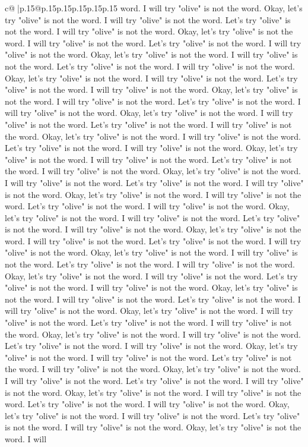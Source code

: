 \documentclass{article}
\begin{document}
{\begin{supertabular}{c@{$\;$}|p{.15\linewidth}@{}p{.15\linewidth}p{.15\linewidth}p{.15\linewidth}p{.15\linewidth}p{.15\linewidth}}
{{{word. I will try "olive" is not the word. Okay, let's try "olive" is not the word. I will try "olive" is not the word. Let's try "olive" is not the word. I will try "olive" is not the word. Okay, let's try "olive" is not the word. I will try "olive" is not the word. Let's try "olive" is not the word. I will try "olive" is not the word. Okay, let's try "olive" is not the word. I will try "olive" is not the word. Let's try "olive" is not the word. I will try "olive" is not the word. Okay, let's try "olive" is not the word. I will try "olive" is not the word. Let's try "olive" is not the word. I will try "olive" is not the word. Okay, let's try "olive" is not the word. I will try "olive" is not the word. Let's try "olive" is not the word. I will try "olive" is not the word. Okay, let's try "olive" is not the word. I will try "olive" is not the word. Let's try "olive" is not the word. I will try "olive" is not the word. Okay, let's try "olive" is not the word. I will try "olive" is not the word. Let's try "olive" is not the word. I will try "olive" is not the word. Okay, let's try "olive" is not the word. I will try "olive" is not the word. Let's try "olive" is not the word. I will try "olive" is not the word. Okay, let's try "olive" is not the word. I will try "olive" is not the word. Let's try "olive" is not the word. I will try "olive" is not the word. Okay, let's try "olive" is not the word. I will try "olive" is not the word. Let's try "olive" is not the word. I will try "olive" is not the word. Okay, let's try "olive" is not the word. I will try "olive" is not the word. Let's try "olive" is not the word. I will try "olive" is not the word. Okay, let's try "olive" is not the word. I will try "olive" is not the word. Let's try "olive" is not the word. I will try "olive" is not the word. Okay, let's try "olive" is not the word. I will try "olive" is not the word. Let's try "olive" is not the word. I will try "olive" is not the word. Okay, let's try "olive" is not the word. I will try "olive" is not the word. Let's try "olive" is not the word. I will try "olive" is not the word. Okay, let's try "olive" is not the word. I will try "olive" is not the word. Let's try "olive" is not the word. I will try "olive" is not the word. Okay, let's try "olive" is not the word. I will try "olive" is not the word. Let's try "olive" is not the word. I will try "olive" is not the word. Okay, let's try "olive" is not the word. I will try "olive" is not the word. Let's try "olive" is not the word. I will try "olive" is not the word. Okay, let's try "olive" is not the word. I will try "olive" is not the word. Let's try "olive" is not the word. I will try "olive" is not the word. Okay, let's try "olive" is not the word. I will try "olive" is not the word. Let's try "olive" is not the word. I will try "olive" is not the word. Okay, let's try "olive" is not the word. I will try "olive" is not the word. Let's try "olive" is not the word. I will try "olive" is not the word. Okay, let's try "olive" is not the word. I will try "olive" is not the word. Let's try "olive" is not the word. I will try "olive" is not the word. Okay, let's try "olive" is not the word. I will }}}
\end{supertabular}}
\end{document}
